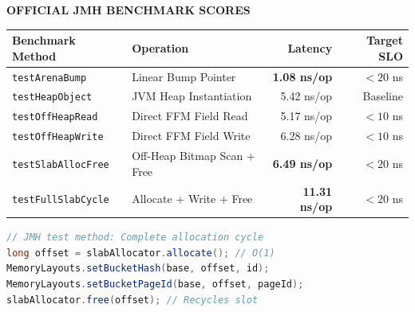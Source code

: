 \documentclass[12pt]{article}
\begin{document}
\begin{minipage}[t]{0.48\textwidth}
    \vspace{0pt}
    {\fontsize{9.5}{11}\selectfont\color{shidenmuted}\textbf{OFFICIAL JMH BENCHMARK SCORES}\par}
    \vspace{3.5mm}
    
    \fontsize{9.5}{12.5}\selectfont
    \noindent
    \begin{tabular}{llrr}
    \toprule
    \textbf{Benchmark Method} & \textbf{Operation} & \textbf{Latency} & \textbf{Target SLO} \\
    \midrule
    \texttt{testArenaBump} & Linear Bump Pointer & \color{shidensuccess}\textbf{1.08 ns/op} & $< 20$ ns \\
    \texttt{testHeapObject} & JVM Heap Instantiation & 5.42 ns/op & Baseline \\
    \texttt{testOffHeapRead} & Direct FFM Field Read & 5.17 ns/op & $< 10$ ns \\
    \texttt{testOffHeapWrite} & Direct FFM Field Write & 6.28 ns/op & $< 10$ ns \\
    \texttt{testSlabAllocFree} & Off-Heap Bitmap Scan + Free & \color{shidensuccess}\textbf{6.49 ns/op} & $< 20$ ns \\
    \texttt{testFullSlabCycle} & Allocate + Write + Free & \color{shidensuccess}\textbf{11.31 ns/op} & $< 20$ ns \\
    \bottomrule
    \end{tabular}
    
    \vspace{3.5mm}
    \begin{lstlisting}[language=Java]
// JMH test method: Complete allocation cycle
long offset = slabAllocator.allocate(); // O(1)
MemoryLayouts.setBucketHash(base, offset, id);
MemoryLayouts.setBucketPageId(base, offset, pageId);
slabAllocator.free(offset); // Recycles slot
    \end{lstlisting}
\end{minipage}
\end{document}
